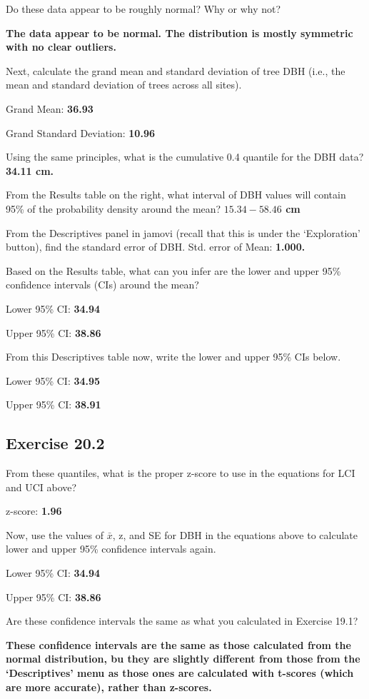 \documentclass[
  openany]{krantz}
\begin{document}
Do these data appear to be roughly normal? Why or why not?

\textbf{The data appear to be normal. The distribution is mostly symmetric with no clear outliers.}

Next, calculate the grand mean and standard deviation of tree DBH (i.e., the mean and standard deviation of trees across all sites).

Grand Mean: \textbf{36.93}

Grand Standard Deviation: \textbf{10.96}

Using the same principles, what is the cumulative 0.4 quantile for the DBH data? \textbf{34.11 cm.}

From the Results table on the right, what interval of DBH values will contain 95\% of the probability density around the mean? \textbf{\(\mathbf{15.34-58.46}\) cm}

From the Descriptives panel in jamovi (recall that this is under the `Exploration'
button), find the standard error of DBH. Std. error of Mean: \textbf{1.000.}

Based on the Results table, what can you infer are the lower and upper 95\%
confidence intervals (CIs) around the mean?

Lower 95\% CI: \textbf{34.94}

Upper 95\% CI: \textbf{38.86}

From this Descriptives table now, write the lower and upper 95\% CIs below.

Lower 95\% CI: \textbf{34.95}

Upper 95\% CI: \textbf{38.91}

\hypertarget{exercise-20.2}{%
\subsection{Exercise 20.2}\label{exercise-20.2}}

From these quantiles, what is the proper z-score to use in the equations for LCI
and UCI above?

z-score: \textbf{1.96}

Now, use the values of \(\bar{x}\), z, and SE for DBH in the equations above to calculate lower and upper 95\% confidence intervals again.

Lower 95\% CI: \textbf{34.94}

Upper 95\% CI: \textbf{38.86}

Are these confidence intervals the same as what you calculated in Exercise 19.1?

\textbf{These confidence intervals are the same as those calculated from the normal distribution, bu they are slightly different from those from the `Descriptives' menu as those ones are calculated with t-scores (which are more accurate), rather than z-scores.}
\end{document}
